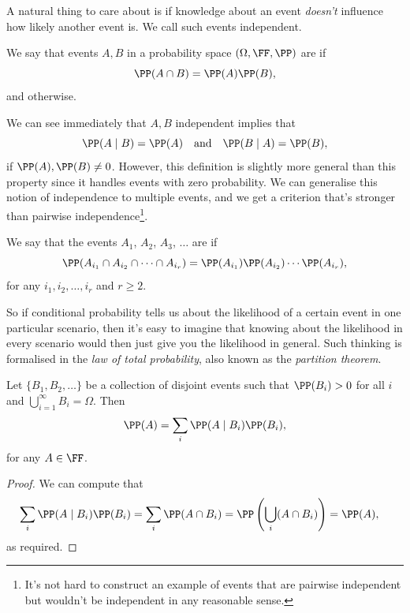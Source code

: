 A natural thing to care about is if knowledge about an event \emph{doesn't} influence how likely another event is. We call such events independent.

\begin{definition}
We say that events $A, B$ in a probability space $(\Omega, \FF, \PP)$ are  if
$$
\PP(A \cap B) = \PP(A) \PP(B),
$$
and  otherwise.
\end{definition}

We can see immediately that $A, B$ independent implies that
$$
\PP(A \mid B) = \PP(A) \quad \text{and} \quad \PP(B \mid A) = \PP(B),
$$
if $\PP(A), \PP(B) \neq 0$. However, this definition is slightly more general than this property since it handles events with zero probability.
We can generalise this notion of independence to multiple events, and we get a criterion that's stronger than pairwise independence\footnote{It's not hard to construct an example of events that are pairwise independent but wouldn't be independent in any reasonable sense.}.

\begin{definition}
	We say that the events $A_1$, $A_2$, $A_3$, $\dots$ are  if
	$$
	\PP(A_{i_1} \cap A_{i_2} \cap \cdots \cap A_{i_r}) = \PP(A_{i_1}) \PP(A_{i_2}) \cdots \PP(A_{i_r}),
	$$
	for any $i_1, i_2, \dots, i_r$ and $r \geq 2$.
\end{definition}

So if conditional probability tells us about the likelihood of a certain event in one particular scenario, then it's easy to imagine that knowing about the likelihood in every scenario would then just give you the likelihood in general. Such thinking is formalised in the \emph{law of total probability}, also known as the \emph{partition theorem}.

\begin{theorem}
	Let $\{B_1, B_2, \dots\}$ be a collection of disjoint events such that $\PP(B_i) > 0$ for all $i$ and $\bigcup_{i = 1}^{\infty} B_i = \Omega$. Then
	$$
	\PP(A) = \sum_i \PP(A \mid B_i) \PP(B_i),
	$$
	for any $A \in \FF$.
\end{theorem}
\begin{proof}
	We can compute that
	\begin{align*}
		\sum_{i} \PP(A \mid B_i) \PP(B_i) &= \sum_i \PP(A \cap B_i) = \PP\left(\bigcup_i (A \cap B_i)\right) = \PP(A),
	\end{align*}
	as required.
\end{proof}

